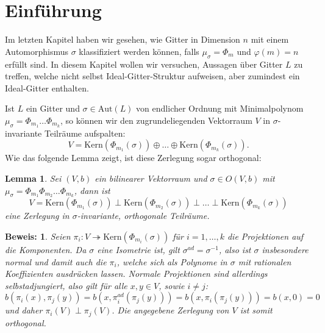 \documentclass[12pt,a4paper,halfparskip,headsepline,bibtotocnumbered]{scrreprt}
\theoremstyle{nummermitklammern}
\newtheorem{lemma}[defsatzusw]{Lemma}
\theoremstyle{nonumberbreak}
\newtheorem{beweis}{Beweis:}
\newcommand{\Kern}{\text{Kern}}
\newcommand{\Aut}{\text{Aut}}
\begin{document}
\section{Einführung}
Im letzten Kapitel haben wir gesehen, wie Gitter in Dimension $n$ mit einem Automorphismus $\sigma$ klassifiziert werden können, falls $\mu_\sigma = \Phi_m$ und $\varphi(m) = n$ erfüllt sind. In diesem Kapitel wollen wir versuchen, Aussagen über Gitter $L$ zu treffen, welche nicht selbst Ideal-Gitter-Struktur aufweisen, aber zumindest ein Ideal-Gitter enthalten.\par
Ist $L$ ein Gitter und $\sigma \in \Aut(L)$ von endlicher Ordnung mit Minimalpolynom $\mu_\sigma = \Phi_{m_1} \dots \Phi_{m_k}$, so können wir den zugrundeliegenden Vektorraum $V$ in $\sigma$-invariante Teilräume aufspalten:
\begin{equation*}
	V = \Kern(\Phi_{m_1}(\sigma)) \oplus \dots \oplus \Kern(\Phi_{m_k}(\sigma)).
\end{equation*}
Wie das folgende Lemma zeigt, ist diese Zerlegung sogar orthogonal:

\begin{framed}
	\begin{lemma}
		Sei $(V,b)$ ein bilinearer Vektorraum und $\sigma \in O(V,b)$ mit $\mu_\sigma = \Phi_{m_1} \Phi_{m_2} \dots \Phi_{m_k}$, dann ist
		\begin{equation*}
			V = \Kern(\Phi_{m_1}(\sigma)) \perp \Kern(\Phi_{m_2}(\sigma)) \perp \dots \perp \Kern(\Phi_{m_k}(\sigma))
		\end{equation*}
		eine Zerlegung in $\sigma$-invariante, orthogonale Teilräume.
	\end{lemma}
\end{framed}

\begin{beweis}
	Seien $\pi_i : V \twoheadrightarrow \Kern(\Phi_{m_i}(\sigma))$ für $i=1,\dots,k$ die Projektionen auf die Komponenten. Da $\sigma$ eine Isometrie ist, gilt $\sigma^{ad} = \sigma^{-1}$, also ist $\sigma$ insbesondere normal und damit auch die $\pi_i$, welche sich als Polynome in $\sigma$ mit rationalen Koeffizienten ausdrücken lassen. Normale Projektionen sind allerdings selbstadjungiert, also gilt für alle $x,y \in V$, sowie $i \neq j$:
		\begin{equation*}
			b(\pi_i(x), \pi_j(y)) = b(x, \pi_i^{ad} (\pi_j(y))) = b(x, \pi_i(\pi_j(y))) = b(x,0) = 0
		\end{equation*}
		und daher $\pi_i(V) \perp \pi_j(V)$. Die angegebene Zerlegung von $V$ ist somit orthogonal.
\end{beweis}
\end{document}
